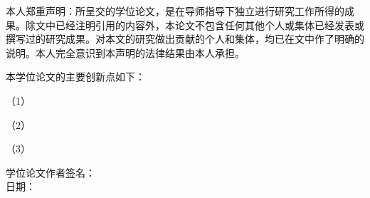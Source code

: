 
\clearpagebyprint
\begin{center}
\end{center}

\vspace{7mm}

本人郑重声明：所呈交的学位论文，是在导师指导下独立进行研究工作所得的成果。除文中已经注明引用的内容外，本论文不包含任何其他个人或集体已经发表或撰写过的研究成果。对本文的研究做出贡献的个人和集体，均已在文中作了明确的说明。本人完全意识到本声明的法律结果由本人承担。

本学位论文的主要创新点如下：

（1）

（2）

（3）


\vspace{20mm}

\begin{flushright}
	学位论文作者签名：\qquad\qquad\qquad\qquad\qquad\qquad\qquad
	\\
	\vspace{7mm}
	日期：\qquad\qquad\qquad\qquad\qquad\qquad\qquad
\end{flushright}